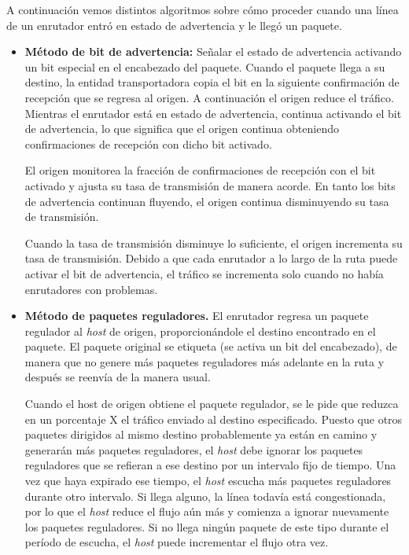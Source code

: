 \documentclass[10pt,a4paper]{report}
\begin{document}
	\par A continuación vemos distintos algoritmos sobre cómo proceder cuando una línea de un enrutador entró en estado de advertencia y le llegó un paquete.

		\begin{itemize}
			\item \textbf{Método de bit de advertencia:} Señalar el estado de advertencia
activando un bit especial en el encabezado del paquete. Cuando el paquete llega a su destino, la entidad transportadora copia el bit en la siguiente confirmación de recepción que se regresa al origen. A continuación el origen reduce el tráfico. Mientras el enrutador está en estado de advertencia, continua activando el bit de advertencia, lo que significa que el origen continua obteniendo confirmaciones de recepción con dicho bit activado.

			\par El origen monitorea la fracción de confirmaciones de recepción con el bit activado y ajusta su tasa de transmisión de manera acorde. En tanto los bits de advertencia continuan fluyendo, el origen continua disminuyendo su tasa de transmisión.

			\par Cuando la tasa de transmisión disminuye lo suficiente, el origen incrementa su tasa de transmisión. Debido a que cada enrutador a lo largo de la ruta puede activar el bit de advertencia, el tráfico se incrementa solo cuando no había enrutadores con problemas.

			\item \textbf{Método de paquetes reguladores.} El enrutador regresa un paquete regulador al \textit{host} de origen, proporcionándole el destino encontrado en el paquete. El paquete original se etiqueta (se activa un bit del encabezado), de manera que no genere más paquetes reguladores más adelante en la ruta y después se reenvía de la manera usual.
	
			\par Cuando el host de origen obtiene el paquete regulador, se le pide que reduzca en un porcentaje X el tráfico enviado al destino especificado. Puesto que otros paquetes dirigidos al mismo destino probablemente ya están en camino y generarán más paquetes reguladores, el \textit{host} debe ignorar los paquetes reguladores que se refieran a ese destino por un intervalo fijo de tiempo. Una vez que haya expirado ese tiempo, el \textit{host} escucha más paquetes reguladores durante otro intervalo. Si llega alguno, la línea todavía está congestionada, por lo que el \textit{host} reduce el flujo aún más y comienza a ignorar nuevamente los paquetes reguladores. Si no llega ningún paquete de este tipo durante el período de escucha, el \textit{host} puede incrementar el flujo otra vez.
 

\end{itemize}
\end{document}

